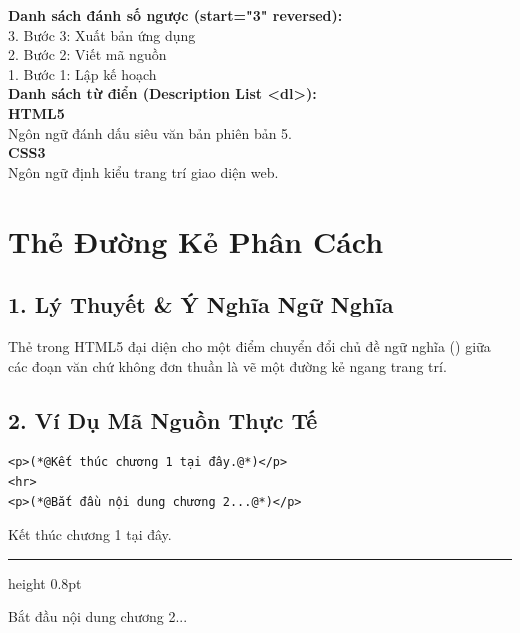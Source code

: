 \begin{browserWindow}
\sffamily\small
\textbf{Danh sách đánh số ngược (start="3" reversed):}\\[2pt]
3. Bước 3: Xuất bản ứng dụng\\
2. Bước 2: Viết mã nguồn\\
1. Bước 1: Lập kế hoạch\\[6pt]
\textbf{Danh sách từ điển (Description List <dl>):}\\[2pt]
\textbf{HTML5}\\
\quad Ngôn ngữ đánh dấu siêu văn bản phiên bản 5.\\[2pt]
\textbf{CSS3}\\
\quad Ngôn ngữ định kiểu trang trí giao diện web.
\end{browserWindow}

\section{Thẻ Đường Kẻ Phân Cách }
\subsection{1. Lý Thuyết \& Ý Nghĩa Ngữ Nghĩa}
Thẻ  trong HTML5 đại diện cho một điểm chuyển đổi chủ đề ngữ nghĩa () giữa các đoạn văn chứ không đơn thuần là vẽ một đường kẻ ngang trang trí.

\subsection{2. Ví Dụ Mã Nguồn Thực Tế}
\begin{codeWindow}
\begin{lstlisting}[language=HTML5]
<p>(*@Kết thúc chương 1 tại đây.@*)</p>
<hr>
<p>(*@Bắt đầu nội dung chương 2...@*)</p>
\end{lstlisting}
\end{codeWindow}

\begin{browserWindow}
\sffamily\small
Kết thúc chương 1 tại đây.\par\vspace{4pt}
{\color{gray!40}\hrule height 0.8pt}\vspace{4pt}
Bắt đầu nội dung chương 2...
\end{browserWindow}


